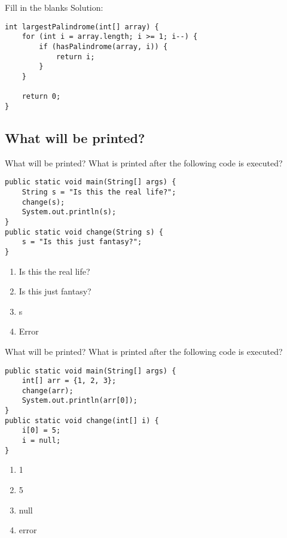 \documentclass[9pt]{beamer}
\begin{document}
\begin{frame}[fragile]{Fill in the blanks}
  Solution:
  \begin{lstlisting}
int largestPalindrome(int[] array) {
    for (int i = array.length; i >= 1; i--) {
        if (hasPalindrome(array, i)) {
            return i;
        }
    }

    return 0;
}
  \end{lstlisting}
\end{frame}

\subsection{What will be printed?}
\begin{frame}[fragile]{What will be printed?}
  What is printed after the following code is executed?
  \begin{lstlisting}
public static void main(String[] args) {
    String s = "Is this the real life?";
    change(s);
    System.out.println(s);
}
public static void change(String s) {
    s = "Is this just fantasy?";
}
  \end{lstlisting}
  \begin{enumerate}
    \item
      \alert<2>{Is this the real life?}
    \item
      Is this just fantasy?
    \item
      s
    \item
      Error
  \end{enumerate}
\end{frame}

\begin{frame}[fragile]{What will be printed?}
  What is printed after the following code is executed?
  \begin{lstlisting}
public static void main(String[] args) {
    int[] arr = {1, 2, 3};
    change(arr);
    System.out.println(arr[0]);
}
public static void change(int[] i) {
    i[0] = 5;
    i = null;
}
  \end{lstlisting}
  \begin{enumerate}
    \item
      1
    \item
      \alert<2>{5}
    \item
      null
    \item
      error
  \end{enumerate}
\end{frame}
\end{document}
